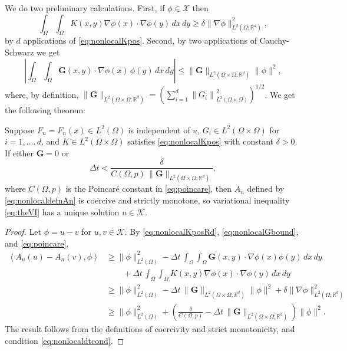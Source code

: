 \documentclass[final,leqno,onefignum,onetabnum]{siamltex1213bueler}
\newcommand\bG{\mathbf{G}}
\renewcommand{\grad}{\nabla}
\newcommand{\ip}[2]{\ensuremath{\left<#1,#2\right>}}
\newcommand\RR{\mathbb{R}}
\begin{document}
We do two preliminary calculations.  First, if $\phi\in\mathcal{X}$ then
\begin{equation}
  \int_\Omega \int_\Omega K(x,y) \grad \phi(x) \cdot \grad \phi(y)\,dx\,dy \ge \delta \|\grad\phi\|_{L^2(\Omega;\RR^d)}^2,  \label{eq:nonlocalKposRd}
\end{equation}
by $d$ applications of \eqref{eq:nonlocalKpos}.  Second, by two applications of Cauchy-Schwarz we get
\begin{equation}
\left|\int_\Omega \int_\Omega \bG(x,y) \cdot \grad \phi(x)\,\phi(y) \,dx\,dy\right|
  \le \|\bG\|_{L^2(\Omega\times\Omega;\RR^d)} \|\phi\|^2,   \label{eq:nonlocalGbound}
\end{equation}
where, by definition, $\|\bG\|_{L^2(\Omega\times\Omega;\RR^d)} = \left(\sum_{i=1}^d \left\|G_i\right\|_{L^2(\Omega \times \Omega)}^2\right)^{1/2}$.  We get the following theorem:

\begin{theorem}  \label{thm:nonlocalwellposed}  Suppose $F_n=F_n(x) \in L^2(\Omega)$ is independent of $u$, $G_i \in L^2(\Omega\times\Omega)$ for $i=1,\dots,d$, and $K \in L^2(\Omega\times\Omega)$ satisfies \eqref{eq:nonlocalKpos} with constant $\delta >0$.  If either $\bG=0$ or
\begin{equation}
  \Delta t < \frac{\delta}{C(\Omega,p)\, \|\bG\|_{L^2(\Omega\times\Omega;\RR^d)}},  \label{eq:nonlocaldtcond}
\end{equation}
where $C(\Omega,p)$ is the Poincar\'e constant in \eqref{eq:poincare}, then $A_n$ defined by \eqref{eq:nonlocaldefnAn} is coercive and strictly monotone, so variational inequality \eqref{eq:theVI} has a unique solution $u\in\mathcal{K}$.
\end{theorem}

\begin{proof}  Let $\phi=u-v$ for $u,v\in\mathcal{K}$.  By \eqref{eq:nonlocalKposRd}, \eqref{eq:nonlocalGbound}, and \eqref{eq:poincare},
\begin{align*}
\ip{A_n(u)-A_n(v)}{\phi} &\ge \|\phi\|_{L^2(\Omega)}^2 - \Delta t\,\int_\Omega \int_\Omega \bG(x,y) \cdot \grad \phi(x) \phi(y)\,dx\,dy \\
    &\qquad + \Delta t\,\int_\Omega \int_\Omega K(x,y) \grad \phi(x) \cdot \grad \phi(y)\,dx\,dy \\
    &\ge \|\phi\|_{L^2(\Omega)}^2 - \Delta t\,\|\bG\|_{L^2(\Omega\times\Omega;\RR^d)} \|\phi\|^2 + \delta \|\grad\phi\|_{L^2(\Omega;\RR^d)}^2 \\
    &\ge \|\phi\|_{L^2(\Omega)}^2 + \left(\frac{\delta}{C(\Omega,p)} - \Delta t\,\|\bG\|_{L^2(\Omega\times\Omega;\RR^d)}\right) \|\phi\|^2.
\end{align*}
The result follows from the definitions of coercivity and strict monotonicity, and condition \eqref{eq:nonlocaldtcond}.
\end{proof}
\end{document}
